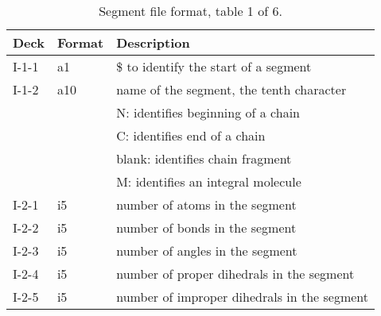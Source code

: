 \begin{table}[htbp]
\begin{center}
\begin{tabular*}{150mm}{p{15mm}p{12mm}l}
\hline\hline
Deck  & Format & Description \\ \hline
I-1-1 & a1     & \$ to identify the start of a segment \\ %
I-1-2 & a10    & name of the segment, the tenth character\\
      &        & N: identifies beginning of a chain\\
      &        & C: identifies end of a chain\\
      &        & blank: identifies chain fragment\\
      &        & M: identifies an integral molecule\\
I-2-1 & i5     & number of atoms in the segment\\
I-2-2 & i5     & number of bonds in the segment\\
I-2-3 & i5     & number of angles in the segment\\
I-2-4 & i5     & number of proper dihedrals in the segment\\
I-2-5 & i5     & number of improper dihedrals in the segment\\
\hline
\end{tabular*}
\caption{Segment file format, table 1 of 6.\label{tbl:nwaseg1}}
\end{center}
\end{table}

